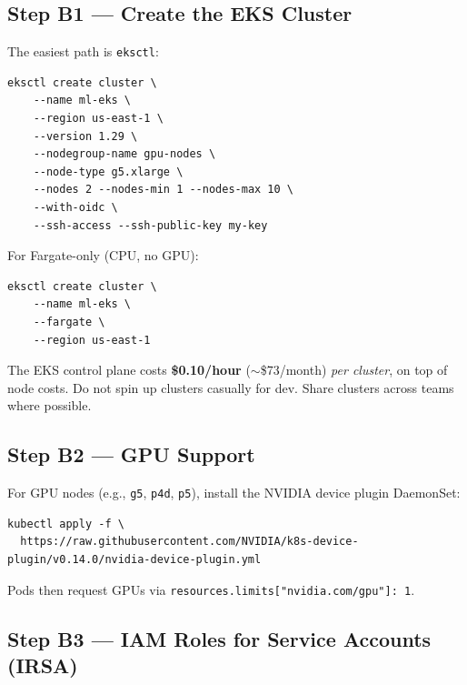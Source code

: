 \documentclass[11pt,a4paper]{article}
\begin{document}
\subsection{Step B1 --- Create the EKS Cluster}

The easiest path is \texttt{eksctl}:

\begin{lstlisting}[style=bashcode]
eksctl create cluster \
    --name ml-eks \
    --region us-east-1 \
    --version 1.29 \
    --nodegroup-name gpu-nodes \
    --node-type g5.xlarge \
    --nodes 2 --nodes-min 1 --nodes-max 10 \
    --with-oidc \
    --ssh-access --ssh-public-key my-key
\end{lstlisting}

For Fargate-only (CPU, no GPU):

\begin{lstlisting}[style=bashcode]
eksctl create cluster \
    --name ml-eks \
    --fargate \
    --region us-east-1
\end{lstlisting}

\begin{warnbox}
The EKS control plane costs \textbf{\$0.10/hour} ($\sim$\$73/month) \emph{per
cluster}, on top of node costs. Do not spin up clusters casually for dev.
Share clusters across teams where possible.
\end{warnbox}

\subsection{Step B2 --- GPU Support}

For GPU nodes (e.g., \texttt{g5}, \texttt{p4d}, \texttt{p5}), install the
NVIDIA device plugin DaemonSet:

\begin{lstlisting}[style=bashcode]
kubectl apply -f \
  https://raw.githubusercontent.com/NVIDIA/k8s-device-plugin/v0.14.0/nvidia-device-plugin.yml
\end{lstlisting}

Pods then request GPUs via \texttt{resources.limits["nvidia.com/gpu"]: 1}.

\subsection{Step B3 --- IAM Roles for Service Accounts (IRSA)}
\end{document}
